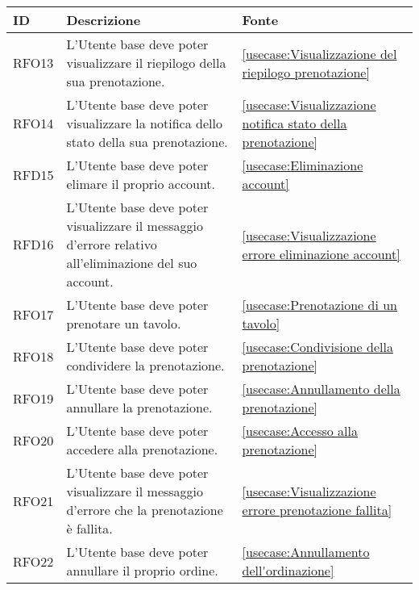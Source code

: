 \begin{table}[H]
	\renewcommand{\arraystretch}{1.5}
	\centering
	\begin{tabularx}{\textwidth}{l|X|p{2cm}}
		\textbf{ID} & \textbf{Descrizione}                                                                                                      & \textbf{Fonte} \\
		\hline
		RFO13       & L'Utente base deve poter visualizzare il riepilogo della sua prenotazione.                                                     &  \autoref{usecase:Visualizzazione del riepilogo prenotazione}           \\
		\hline
		RFO14       & L'Utente base deve poter visualizzare la notifica dello stato della sua prenotazione.                      					& \autoref{usecase:Visualizzazione notifica stato della prenotazione}            \\
		\hline
		RFD15       & L'Utente base deve poter elimare il proprio account.                                                    						& \autoref{usecase:Eliminazione account}            \\
		\hline
		RFD16       & L'Utente base deve poter visualizzare il messaggio d'errore relativo all'eliminazione del suo account.                       &  \autoref{usecase:Visualizzazione errore eliminazione account}           \\
		\hline
		RFO17       & L'Utente base deve poter prenotare un tavolo.        																		& \autoref{usecase:Prenotazione di un tavolo}            \\
		\hline
		RFO18       & L'Utente base deve poter condividere la prenotazione. 																			&  \autoref{usecase:Condivisione della prenotazione}           \\
		\hline
		RFO19       & L'Utente base deve poter annullare la prenotazione.						                                                 & \autoref{usecase:Annullamento della prenotazione}            \\
		\hline
		RFO20       &  L'Utente base deve poter accedere alla prenotazione.                          											 &  \autoref{usecase:Accesso alla prenotazione}           \\
		\hline
		RFO21       & L'Utente base deve poter visualizzare il messaggio d'errore che la prenotazione è fallita.                       			 &  \autoref{usecase:Visualizzazione errore prenotazione fallita}           \\
		\hline
		RFO22       & L'Utente base deve poter annullare il proprio ordine.										                    				 &  \autoref{usecase:Annullamento dell'ordinazione}           \\

\end{tabularx}
\end{table}
